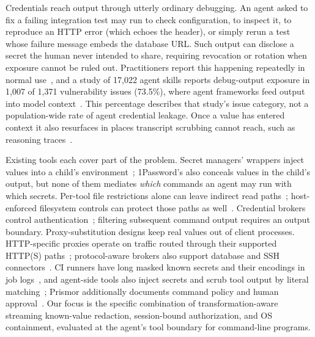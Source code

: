 \documentclass[10pt,twocolumn]{article}
\newcommand{\code}[1]{\textup{\texttt{\detokenize{#1}}}}
\begin{document}
Credentials reach output through utterly ordinary debugging. An agent asked to
fix a failing integration test may run \code{printenv} to check configuration,
\code{cat .env} to inspect it, \code{curl -v} to reproduce an HTTP error (which
echoes the \code{Authorization} header), or simply rerun a test whose failure
message embeds the database URL. Such output can disclose a secret the human
never intended to share, requiring revocation or rotation when exposure cannot
be ruled out. Practitioners report this
happening repeatedly in normal use~\citep{cc_issue64326,cc_issue32523},
and a study of 17{,}022 agent skills reports debug-output exposure in
1{,}007 of 1{,}371 vulnerability issues (73.5\%), where agent frameworks feed
output into model context~\citep{chen2026skillsleak}. This percentage describes
that study's issue category, not a population-wide rate of agent credential leakage. Once a value has entered context it also
resurfaces in places transcript scrubbing cannot reach, such as reasoning
traces~\citep{panfilov2026reasoning}.

Existing tools each cover part of the problem. Secret managers' \code{run}
wrappers inject values into a child's environment~\citep{onepassword_oprun,doppler_cli,infisical_run};
1Password's also conceals values in the child's output, but none of them
mediates \emph{which} commands an agent may run with which secrets. Per-tool
file restrictions alone can leave indirect read paths~\citep{munis2025knostic,eve2026env};
host-enforced filesystem controls can protect those paths as well~\citep{claudecode_permissions,claudecode_sandboxing}.
Credential brokers control authentication~\citep{onepassword2026unified,bitwarden2026agentaccess};
filtering subsequent command output requires an output boundary. Proxy-substitution
designs keep real values out of client processes. HTTP-specific proxies operate
on traffic routed through their supported HTTP(S) paths~\citep{claudecode_sandboxing,infisical_agentproxy,flyio_tokenizer};
protocol-aware brokers also support database and SSH connectors~\citep{cyberark_secretless}.
CI runners have long masked known secrets and their encodings in job
logs~\citep{githubrunner2019encoders,github2026secureuse}, and agent-side tools
also inject secrets and scrub tool output by literal
matching~\citep{fnox_mcp,prismor2026}; Prismor additionally documents command
policy and human approval~\citep{prismor_decisions,prismor_approvals}. Our focus
is the specific combination of transformation-aware streaming known-value
redaction, session-bound authorization, and OS containment, evaluated at the
agent's tool boundary for command-line programs.
\end{document}
